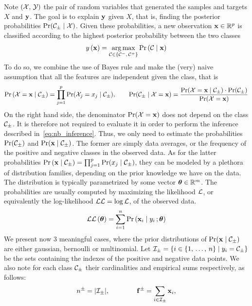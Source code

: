 Note $\left( \mathcal{X},\, \mathcal{Y} \right)$ the pair of random variables that generated the samples and targets $X$ and $\mathbf{y}$.
The goal is to explain $\mathbf{y}$ given $X$, that is, finding the posterior probabilities $\Pr(\mathcal{C}_\pm \mid \mathcal{X})$.
Given these probabilities, a new observation $\mathbf{x} \in \mathbb{R}^p$ is classified according to the highest
posterior probability between the two classes
\begin{equation}\label{eq:nb_inference}
        y\left( \mathbf{x} \right) = \underset{\mathcal{C} \in \left\{ \mathcal{C}^-,\, \mathcal{C}^+ \right\}}{\operatorname*{arg\,max}} \Pr\left( \mathcal{C} \mid \mathbf{x} \right)
\end{equation}
To do so, we combine the use of Bayes rule and make the (very) naive assumption that
all the features are independent given the class, that is
\begin{equation}
        \Pr\left( \mathcal{X} = \mathbf{x} \mid \mathcal{C}_\pm \right) = \prod_{j = 1}^p \Pr(\mathcal{X}_j = x_j \mid \mathcal{C}_\pm)
        ,\qquad
        \Pr(\mathcal{C}_\pm \mid \mathcal{X} = \mathbf{x}) = \frac{\Pr(\mathcal{X} = \mathbf{x} \mid \mathcal{C}_\pm) \cdot \Pr(\mathcal{C}_\pm)}{\Pr(\mathcal{X} = \mathbf{x})}
\end{equation}
On the right hand side,
the denominator $\Pr(\mathcal{X} = \mathbf{x})$ does not depend on the class $\mathcal{C}_\pm$.
It is therefore not required to evaluate it in order to perform the inference described in~\ref{eq:nb_inference}.
Thus, we only need to estimate the probabilities $\Pr(\mathcal{C}_\pm)$ and $\Pr(\mathbf{x} \mid \mathcal{C}_\pm)$.
The former are simply data averages, or the frequency of the positive and negative classes in the observed data.
As for the latter probabilities $\Pr\left( \mathbf{x} \mid \mathcal{C}_\pm \right) = \prod_{j = 1}^p \Pr(x_j \mid \mathcal{C}_\pm)$,
they can be modeled by a plethora of distribution families, depending on the prior knowledge we have on the data.
The distribution is typically parametrized by some vector $\bm{\theta} \in \mathbb{R}^m$.
The probabilities are usually computed by maximizing the likelihood $\mathcal{L}$,
or equivalently the log-likelihood $\mathcal{L}\mathcal{L} = \log\mathcal{L}$, of the observed data.
\begin{equation*}
        \mathcal{L}\mathcal{L}\left( \bm{\theta} \right) = \sum_{i = 1}^n \Pr\left( \mathbf{x}_i \mid y_i \,; \bm{\theta} \right)
\end{equation*}
We present now 3 meaningful cases, where the prior distributions of $\Pr(\mathbf{x} \mid \mathcal{C}_\pm)$ are either
gaussian, bernoulli or multinomial.
Let $\mathcal{I}_\pm = \left\{ i \in \left\{ 1,\, \dots,\, n \right\} \mid y_i = \mathcal{C}_\pm \right\}$ be the sets containing the
indexes of the positive and negative data points.
We also note for each class $\mathcal{C}_\pm$ their cardinalities and empirical sums respectively, as follows:
\begin{equation*}
        n^\pm = | \mathcal{I}_\pm |,
        \qquad\qquad
        \mathbf{f}^\pm = \sum_{i \in \mathcal{I}_\pm} \mathbf{x}_i,
\end{equation*}

